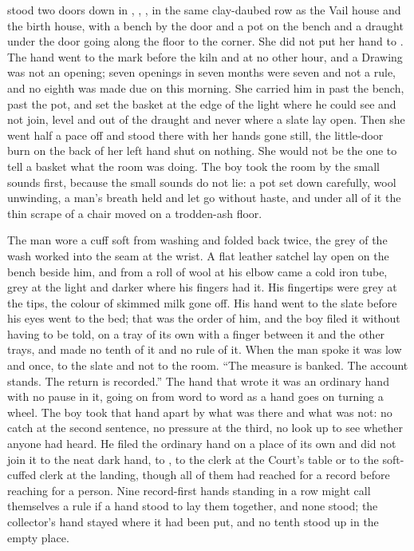  stood two doors down  in , , , in the same clay-daubed row as the Vail house and the birth house, with a bench by the door and a pot on the bench and a draught under the door going along the floor to the corner. She did not put her hand to . The hand went to the mark before the kiln and at no other hour, and a Drawing was not an opening; seven openings in seven months were seven and not a rule, and no eighth was made due on this morning. She carried him in past the bench, past the pot, and set the basket at the edge of the light where he could see and not join, level and out of the draught and never where a slate lay open. Then she went half a pace off and stood there with her hands gone still, the little-door burn on the back of her left hand shut on nothing. She would not be the one to tell a basket what the room was doing. The boy took the room by the small sounds first, because the small sounds do not lie: a pot set down carefully, wool unwinding, a man's breath held and let go without haste, and under all of it the thin scrape of a chair moved on a trodden-ash floor.

\scenebreak

The man wore a cuff soft from washing and folded back twice, the grey of the wash worked into the seam at the wrist. A flat leather satchel lay open on the bench beside him, and from a roll of wool at his elbow came a cold iron tube, grey at the light and darker where his fingers had it. His fingertips were grey at the tips, the colour of skimmed milk gone off. His hand went to the slate before his eyes went to the bed; that was the order of him, and the boy filed it without having to be told, on a tray of its own with a finger between it and the other trays, and made no tenth of it and no rule of it. When the man spoke it was low and once, to the slate and not to the room. “The measure is banked. The account stands. The return is recorded.” The hand that wrote it was an ordinary hand with no pause in it, going on from word to word as a hand goes on turning a wheel. The boy took that hand apart by what was there and what was not: no catch at the second sentence, no pressure at the third, no look up to see whether anyone had heard. He filed the ordinary hand on a place of its own and did not join it to the neat dark hand, to , to the clerk at the Court's table or to the soft-cuffed clerk at the landing, though all of them had reached for a record before reaching for a person. Nine record-first hands standing in a row might call themselves a rule if a hand stood to lay them together, and none stood; the collector's hand stayed where it had been put, and no tenth stood up in the empty place.

